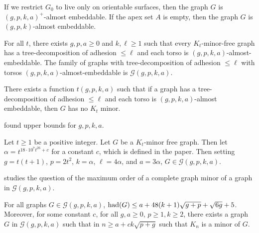 If we restrict $G_0$ to live only on orientable surfaces, then the graph $G$ is ${(g, p, k, a)}^+$-almost embeddable. If the apex set $A$ is empty, then the graph $G$ is $(g, p, k)$-almost embeddable. 

\begin{theorem}\label{thm:gmst}
	For all \(t\), there exists \(g, p, a \geq 0\) and \(k, \ell \geq 1\) such that every \(K_t\)-minor-free graph has a tree-decomposition of adhesion \(\leq \ell\) and each torso is \((g, p, k, a)\)-almost-embeddable. The  family of graphs with tree-decomposition of adhesion $\leq \ell$ with torsos $(g, p, k, a)$-almost-embeddable is \(\mathcal{G}(g, p, k, a)\). 
\end{theorem}
There exists a function \(t(g, p, k, a)\) such that if a graph has a tree-decomposition of adhesion \(\leq \ell\) and each torso is \((g, p, k, a)\)-almost embeddable, then \(G\) has no \(K_t\) minor.

\textcite{kawarabayashiQuicklyExcludingNonplanar2021} found upper bounds for $g, p, k, a$. 
\begin{theorem}
	Let $t \geq 1$ be a positive integer. Let $G$ be a $K_t$-minor free graph. Then let $\alpha = t^{18 \cdot 10^{7} t^{26} + c}$ for a constant $c$, which is defined in the paper. Then setting $g = t(t+1)$, $p = 2t^2$, $k = \alpha$, $\ell = 4\alpha$, and $a = 3\alpha$, $G \in \mathcal{G}(g,p,k,a)$. 
\end{theorem}

\textcite{joretCompleteGraphMinors2013} studies the question of the maximum order of a complete graph minor of a graph in $\mathcal{G}(g, p, k, a)$. 
\begin{theorem}\label{thm:graph_structure_bound_theorem}
	For all graphs \(G \in \mathcal{G}(g, p, k, a)\),
	\(\operatorname{had}(G) \leq a + 48(k + 1)\sqrt{g + p} + \sqrt{6g} + 5\). Moreover, for some constant $c$, for all $g, a \geq 0$, $p \geq 1, k \geq 2$, there exists a graph $G$ in \(\mathcal{G}(g, p, k, a)\) such that in \(n \geq a + c k\sqrt{p + g}\) such that \(K_n\) is a minor of $G$.
\end{theorem}
